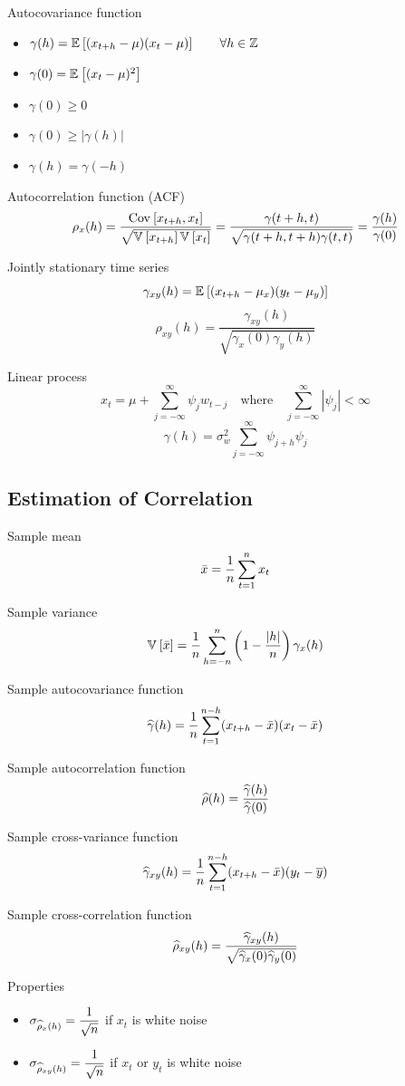 \documentclass[landscape]{article}
\begin{document}
\begin{multicols*}{2}
Autocovariance function
\begin{itemize}
  \item $\gamma(h) = \mathbb{E}_{}\left[(x_{t+h}-\mu)(x_t-\mu)\right] \qquad \forall h\in\mathbb{Z}$
  \item $\gamma(0) = \mathbb{E}_{}\left[(x_t-\mu)^2\right]$
  \item $\gamma(0) \ge 0$
  \item $\gamma(0) \ge |\gamma(h)|$
  \item $\gamma(h) = \gamma(-h)$
\end{itemize}

Autocorrelation function (ACF)
\[\rho_x(h) = \frac{\mathrm{Cov}_{}\left[x_{t+h},x_t\right]}{\sqrt{\mathbb{V}_{}\left[x_{t+h}\right]\mathbb{V}_{}\left[x_t\right]}}
          = \frac{\gamma(t+h,t)}{\sqrt{\gamma(t+h,t+h)\gamma(t,t)}}
          = \frac{\gamma(h)}{\gamma(0)}\]

Jointly stationary time series
\[\gamma_{xy}(h) = \mathbb{E}_{}\left[(x_{t+h}-\mu_x)(y_t-\mu_y)\right]\]
\[\rho_{xy}(h) = \frac{\gamma_{xy}(h)}{\sqrt{\gamma_x(0)\gamma_y(h)}}\]

Linear process
\[x_t = \mu + \sum_{j=-\infty}^\infty \psi_j w_{t-j} \quad\text{where}\quad
\sum_{j=-\infty}^\infty |\psi_j| < \infty\]
\[\gamma(h) = \sigma_w^2 \sum_{j=-\infty}^\infty \psi_{j+h}\psi_j\]

\subsection{Estimation of Correlation}

Sample mean
\[\bar{x} = \frac{1}{n}\sum_{t=1}^n x_t\]

Sample variance
\[\mathbb{V}_{}\left[\bar{x}\right] = \frac{1}{n}\sum_{h=-n}^n \left(1-\frac{|h|}{n}\right)\gamma_x(h)\]

Sample autocovariance function
\[\widehat{\gamma}(h) = \frac{1}{n}\sum_{t=1}^{n-h}(x_{t+h}-\bar{x})(x_t-\bar{x})\]

Sample autocorrelation function
\[\widehat{\rho}(h) = \frac{\widehat{\gamma}(h)}{\widehat{\gamma}(0)}\]

Sample cross-variance function
\[\widehat{\gamma}_{xy}(h) = \frac{1}{n} \sum_{t=1}^{n-h}(x_{t+h}-\bar{x})(y_t - \overline{y})\]

Sample cross-correlation function
\[\widehat{\rho}_{xy}(h) = \frac{\widehat{\gamma}_{xy}(h)}{\sqrt{\widehat{\gamma}_x(0) \widehat{\gamma}_y(0)}}\]

Properties
\begin{itemize}
  \item $\sigma_{\widehat{\rho}_x(h)} = \displaystyle\frac{1}{\sqrt{n}}$
    if $x_t$ is white noise
  \item $\sigma_{\widehat{\rho}_{xy}(h)} = \displaystyle\frac{1}{\sqrt{n}}$
    if $x_t$ or $y_t$ is white noise
\end{itemize}


\end{multicols*}
\end{document}
